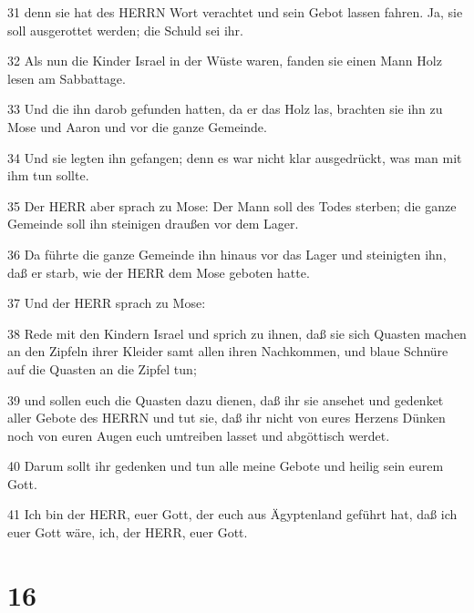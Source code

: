 \par 31 denn sie hat des HERRN Wort verachtet und sein Gebot lassen fahren. Ja, sie soll ausgerottet werden; die Schuld sei ihr.
\par 32 Als nun die Kinder Israel in der Wüste waren, fanden sie einen Mann Holz lesen am Sabbattage.
\par 33 Und die ihn darob gefunden hatten, da er das Holz las, brachten sie ihn zu Mose und Aaron und vor die ganze Gemeinde.
\par 34 Und sie legten ihn gefangen; denn es war nicht klar ausgedrückt, was man mit ihm tun sollte.
\par 35 Der HERR aber sprach zu Mose: Der Mann soll des Todes sterben; die ganze Gemeinde soll ihn steinigen draußen vor dem Lager.
\par 36 Da führte die ganze Gemeinde ihn hinaus vor das Lager und steinigten ihn, daß er starb, wie der HERR dem Mose geboten hatte.
\par 37 Und der HERR sprach zu Mose:
\par 38 Rede mit den Kindern Israel und sprich zu ihnen, daß sie sich Quasten machen an den Zipfeln ihrer Kleider samt allen ihren Nachkommen, und blaue Schnüre auf die Quasten an die Zipfel tun;
\par 39 und sollen euch die Quasten dazu dienen, daß ihr sie ansehet und gedenket aller Gebote des HERRN und tut sie, daß ihr nicht von eures Herzens Dünken noch von euren Augen euch umtreiben lasset und abgöttisch werdet.
\par 40 Darum sollt ihr gedenken und tun alle meine Gebote und heilig sein eurem Gott.
\par 41 Ich bin der HERR, euer Gott, der euch aus Ägyptenland geführt hat, daß ich euer Gott wäre, ich, der HERR, euer Gott.

\chapter{16}

